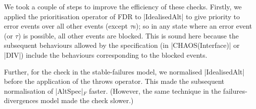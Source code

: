 We took a couple of steps to improve the efficiency of these checks.  Firstly,
we applied the prioritisation operator of FDR to |IdealisedAlt| to give
priority to error events over all other events (except $\tau$s); so in any
state where an error event (or $\tau$) is possible, all other events are
blocked.  This is sound here because the subsequent behaviours allowed by the
specification (in |CHAOS(Interface)| or |DIV|) include the behaviours
corresponding to the blocked events.

Further, for the check in the stable-failures model, we normalised
|IdealisedAlt| before the application of the throws operator.  This made the
subsequent normalisation of |AltSpec|$_F$ faster.  (However, the same
technique in the failures-divergences model made the check slower.)
